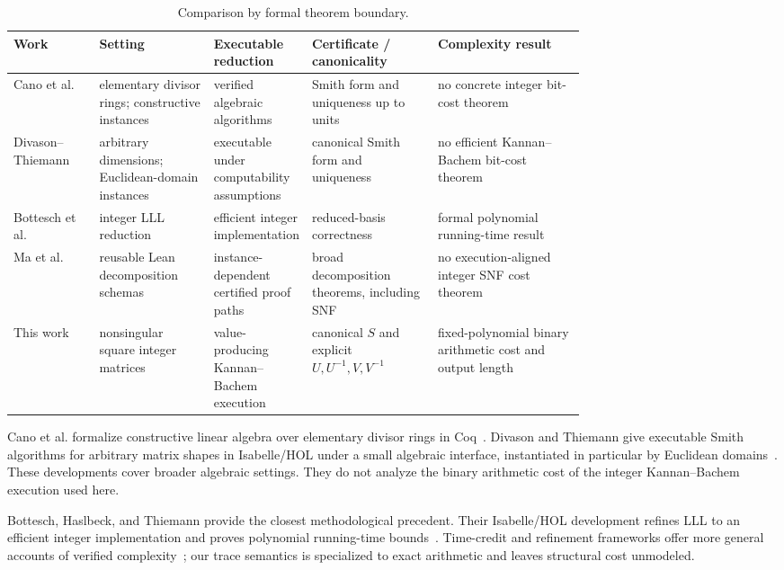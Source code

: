 \documentclass[11pt]{article}
\theoremstyle{definition}
\begin{document}
\begin{table}[ht]
\centering
\footnotesize
\renewcommand{\arraystretch}{1.08}
\begin{tabularx}{\linewidth}{@{}>{\raggedright\arraybackslash}p{0.15\linewidth}>{\raggedright\arraybackslash}p{0.20\linewidth}>{\raggedright\arraybackslash}p{0.17\linewidth}>{\raggedright\arraybackslash}p{0.22\linewidth}>{\raggedright\arraybackslash}X@{}}
\toprule
Work & Setting & Executable reduction & Certificate / canonicality & Complexity result \\
\midrule
Cano et al.~\cite{cano2016} & elementary divisor rings; constructive instances & verified algebraic algorithms & Smith form and uniqueness up to units & no concrete integer bit-cost theorem \\
Divason--Thiemann~\cite{divason2022} & arbitrary dimensions; Euclidean-domain instances & executable under computability assumptions & canonical Smith form and uniqueness & no efficient Kannan--Bachem bit-cost theorem \\
Bottesch et al.~\cite{bottesch2018} & integer LLL reduction & efficient integer implementation & reduced-basis correctness & formal polynomial running-time result \\
Ma et al.~\cite{ma2026} & reusable Lean decomposition schemas & instance-dependent certified proof paths & broad decomposition theorems, including SNF & no execution-aligned integer SNF cost theorem \\
This work & nonsingular square integer matrices & value-producing Kannan--Bachem execution & canonical $S$ and explicit $U,U^{-1},V,V^{-1}$ & fixed-polynomial binary arithmetic cost and output length \\
\bottomrule
\end{tabularx}
\caption{Comparison by formal theorem boundary.}
\label{tab:related}
\end{table}

Cano et al. formalize constructive linear algebra over elementary divisor rings in Coq~\cite{cano2016}.  Divason and Thiemann give executable Smith algorithms for arbitrary matrix shapes in Isabelle/HOL under a small algebraic interface, instantiated in particular by Euclidean domains~\cite{divason2022}.  These developments cover broader algebraic settings.  They do not analyze the binary arithmetic cost of the integer Kannan--Bachem execution used here.

Bottesch, Haslbeck, and Thiemann provide the closest methodological precedent.  Their Isabelle/HOL development refines LLL to an efficient integer implementation and proves polynomial running-time bounds~\cite{bottesch2018}.  Time-credit and refinement frameworks offer more general accounts of verified complexity~\cite{zhan2018,gueneau2018}; our trace semantics is specialized to exact arithmetic and leaves structural cost unmodeled.
\end{document}
